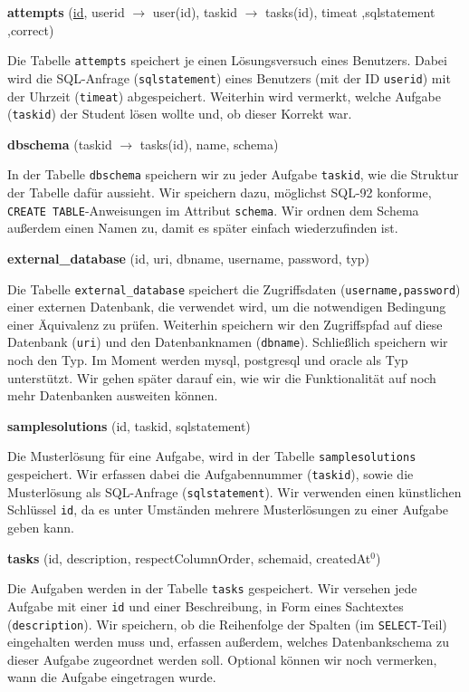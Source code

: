 \textbf{attempts} (\underline{id}, userid $\to$ user(id), taskid $\to$ tasks(id), timeat ,sqlstatement ,correct)

Die Tabelle \verb|attempts| speichert je einen Lösungsversuch eines Benutzers. Dabei wird die SQL-Anfrage (\verb|sqlstatement|) eines Benutzers (mit der ID \verb|userid|) mit der Uhrzeit (\verb|timeat|) abgespeichert. Weiterhin wird vermerkt, welche Aufgabe (\verb|taskid|) der Student lösen wollte und, ob dieser Korrekt war.

\textbf{dbschema} (taskid $\to$ tasks(id), name, schema)

In der Tabelle \verb|dbschema| speichern wir zu jeder Aufgabe \verb|taskid|, wie die Struktur der Tabelle dafür aussieht. Wir speichern dazu, möglichst SQL-92 konforme, \verb|CREATE TABLE|-Anweisungen im Attribut \verb|schema|. Wir ordnen dem Schema außerdem einen Namen zu, damit es später einfach wiederzufinden ist.

\textbf{external\_database} (id, uri, dbname, username, password, typ)

Die Tabelle \verb|external_database| speichert die Zugriffsdaten (\verb|username,password|) einer externen Datenbank, die verwendet wird, um die notwendigen Bedingung einer Äquivalenz zu prüfen. Weiterhin speichern wir den Zugriffspfad auf diese Datenbank (\verb|uri|) und den Datenbanknamen (\verb|dbname|). Schließlich speichern wir noch den Typ. Im Moment werden mysql, postgresql und oracle als Typ unterstützt. Wir gehen später darauf ein, wie wir die Funktionalität auf noch mehr Datenbanken ausweiten können.

\textbf{samplesolutions} (id, taskid, sqlstatement)

Die Musterlösung für eine Aufgabe, wird in der Tabelle \verb|samplesolutions| gespeichert. Wir erfassen dabei die Aufgabennummer (\verb|taskid|), sowie die Musterlösung als SQL-Anfrage (\verb|sqlstatement|). Wir verwenden einen künstlichen Schlüssel \verb|id|, da es unter Umständen mehrere Musterlösungen zu einer Aufgabe geben kann.

\textbf{tasks} (id, description, respectColumnOrder, schemaid, createdAt$^0$)

Die Aufgaben werden in der Tabelle \verb|tasks| gespeichert. Wir versehen jede Aufgabe mit einer \verb|id| und einer Beschreibung, in Form eines Sachtextes (\verb|description|). Wir speichern, ob die Reihenfolge der Spalten (im \verb|SELECT|-Teil) eingehalten werden muss und, erfassen außerdem, welches Datenbankschema zu dieser Aufgabe zugeordnet werden soll. Optional können wir noch vermerken, wann die Aufgabe eingetragen wurde.


